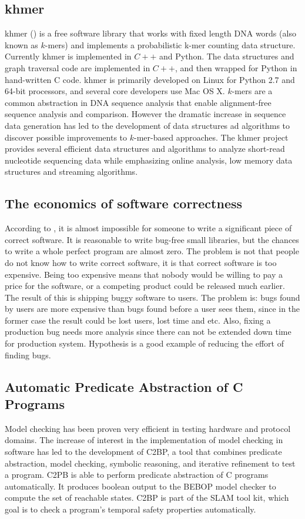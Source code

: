 \documentclass[preprint,nocopyrightspace]{sig-alternate}
\begin{document}
\subsection{khmer}
khmer (\citet{crusoe_khmer_2015}) is a free software library that works with fixed length DNA words (also known as $k$-mers) and implements a probabilistic k-mer counting data structure.
Currently khmer is implemented in $C++$ and Python.
The data structures and graph traversal code are implemented in $C++$,
and then wrapped for Python in hand-written C code.
khmer is primarily developed on Linux for Python 2.7 and 64-bit processors,
and several core developers use Mac OS X.
$k$-mers are a common abstraction in DNA sequence analysis that enable alignment-free sequence analysis and comparison.
However the dramatic increase in sequence data generation has led to the development of data structures ad algorithms to discover possible improvements to $k$-mer-based approaches.
The khmer project provides several efficient data structures and algorithms to analyze short-read nucleotide sequencing data while emphasizing online analysis,
low memory data structures and streaming algorithms.

\subsection{The economics of software correctness}
According to \citet{maciver_economics_2015},
it is almost impossible for someone to write a significant piece of correct software.
It is reasonable to write bug-free small libraries,
but the chances to write a whole perfect program are almost zero.
The problem is not that people do not know how to write correct software,
it is that correct software is too expensive.
Being too expensive means that nobody would be willing to pay a price for the software,
or a competing product could be released much earlier.
The result of this is shipping buggy software to users.
The problem is:
bugs found by users are more expensive than bugs found before a user sees them,
since in the former case the result could be lost users, lost time and etc.
Also, fixing a production bug needs more analysis since 
there can not be extended down time for production system.
Hypothesis is a good example of reducing the effort of finding bugs.

\subsection{Automatic Predicate Abstraction of C Programs}
Model checking has been proven very efficient in testing hardware and protocol domains.\citet{model_checking}
The increase of interest in the implementation of model checking in software has led to the development of C2BP,
a tool that combines predicate abstraction, model checking, symbolic reasoning, and iterative refinement to test a program.
C2PB is able to perform predicate abstraction of C programs automatically.
It produces boolean output to the BEBOP model checker to compute the set of reachable states.
C2BP is part of the SLAM tool kit, which goal is to check a program’s temporal safety properties automatically.


\end{document}
